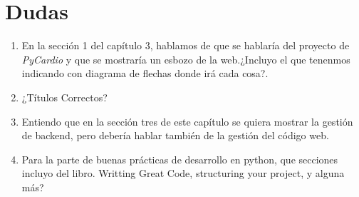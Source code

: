 \chapter*{Dudas}
\begin{enumerate}
    \item En la sección 1 del capítulo 3, hablamos de que se hablaría del proyecto de \emph{PyCardio} y que se mostraría un esbozo de la web.¿Incluyo el que tenenmos indicando con diagrama de flechas donde irá cada cosa?.
    \item ¿Títulos Correctos?
    \item Entiendo que en la sección tres de este capítulo se quiera mostrar la gestión de backend, pero debería hablar también de la gestión del código web.
    \item Para la parte de buenas prácticas de desarrollo en python, que secciones incluyo del libro. Writting Great Code, structuring your project, y alguna más?
\end{enumerate}
